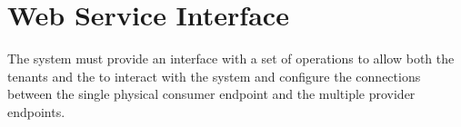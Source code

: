 \section{Web Service Interface}
\label{sec:wsinterface}

The system must provide an interface with a set of operations to allow both the tenants and the  to interact with the system and configure the connections between the single physical consumer endpoint and the multiple provider endpoints. 

\FloatBarrier